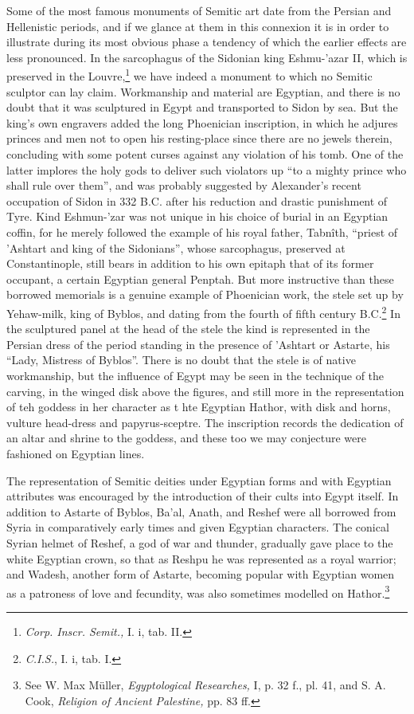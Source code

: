 \documentclass[12pt,oneside]{book}
\begin{document}
Some of the most famous monuments of Semitic art date from the Persian and Hellenistic periods, and if we glance at them in this connexion it is in order to illustrate during its most obvious phase a tendency of which the earlier effects are less pronounced. In the sarcophagus of the Sidonian king Eshmu-'azar II, which is preserved in the Louvre,\footnote{\textit{Corp. Inscr. Semit.,} I. i, tab. II.} we have indeed a monument to which no Semitic sculptor can lay claim. Workmanship and material are Egyptian, and there is no doubt that it was sculptured in Egypt and transported to Sidon by sea. But the king's own engravers added the long Phoenician inscription, in which he adjures princes and men not to open his resting-place since there are no jewels therein, concluding with some potent curses against any violation of his tomb. One of the latter implores the holy gods to deliver such violators up ``to a mighty prince who shall rule over them'', and was probably suggested by Alexander's recent occupation of Sidon in 332 B.C. after his reduction and drastic punishment of Tyre. Kind Eshmun-'zar was not unique in his choice of burial in an Egyptian coffin, for he merely followed the example of his royal father, Tabn\^ith, ``priest of 'Ashtart and king of the Sidonians'', whose sarcophagus, preserved at Constantinople, still bears in addition to his own epitaph that of its former occupant, a certain Egyptian general Penptah. But more instructive than these borrowed memorials is a genuine example of Phoenician work, the stele set up by Yehaw-milk, king of Byblos, and dating from the fourth of fifth century B.C.\footnote{\textit{C.I.S.}, I. i, tab. I.} In the sculptured panel at the head of the stele the kind is represented in the Persian dress of the period standing in the presence of 'Ashtart or Astarte, his ``Lady, Mistress of Byblos''. There is no doubt that the stele is of native workmanship, but the influence of Egypt may be seen in the technique of the carving, in the winged disk above the figures, and still more in the representation of teh goddess in her character as t hte Egyptian Hathor, with disk and horns, vulture head-dress and papyrus-sceptre. The inscription records the dedication of an altar and shrine to the goddess, and these too we may conjecture were fashioned on Egyptian lines. \par 

The representation of Semitic deities under Egyptian forms and with Egyptian attributes was encouraged by the introduction of their cults into Egypt itself. In addition to Astarte of Byblos, Ba'al, Anath, and Reshef were all borrowed from Syria in comparatively early times and given Egyptian characters. The conical Syrian helmet of Reshef, a god of war and thunder, gradually gave place to the white Egyptian crown, so that as Reshpu he was represented as a royal warrior; and Wadesh, another form of Astarte, becoming popular with Egyptian women as a patroness of love and fecundity, was also sometimes modelled on Hathor.\footnote{See W. Max M\"uller, \textit{Egyptological Researches,} I, p. 32 f., pl. 41, and S. A. Cook, \textit{Religion of Ancient Palestine,} pp. 83 ff.} \par 
\end{document}
